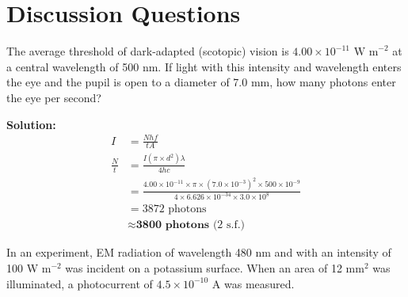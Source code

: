\documentclass[a4paper, 12pt, addpoints]{exam}
\begin{document}
\section{Discussion Questions}
\begin{questions}
\question The average threshold of dark-adapted (scotopic) vision is $4.00 \times 10^{-11}\text{ W m}^{-2}$ at a central wavelength of 500 nm. If light with this intensity and wavelength enters the eye and the pupil is open to a diameter of 7.0 mm, how many photons enter the eye per second?

\begin{tcolorbox}
\textbf{Solution: }
\begin{align*}
    I &= \frac{Nhf}{tA} \\
    \frac{N}{t} &= \frac{I(\pi \times d^2)\lambda}{4hc} \\
    &= \frac{4.00 \times 10^{-11} \times \pi \times (7.0 \times 10^{-3})^2 \times 500 \times 10^{-9}}{4 \times 6.626 \times 10^{-34} \times 3.0 \times 10^8} \\
    &= 3872\text{ photons} \\
    &\approx \textbf{3800 photons}\text{ (2 s.f.)}
\end{align*}
\end{tcolorbox}

\question In an experiment, EM radiation of wavelength 480 nm and with an intensity of 100 W m${}^{-2}$ was incident on a potassium surface. When an area of 12 mm${}^2$ was illuminated, a photocurrent of $4.5\times 10^{-10}$ A was measured.

\end{questions}
\end{document}
